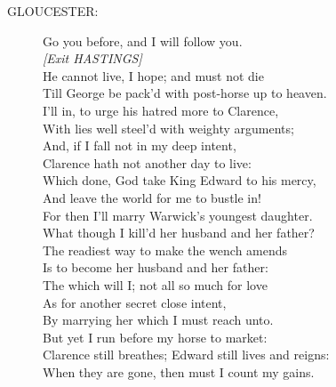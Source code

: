 \documentclass{article}
\begin{document}
\begin{description}
\item[GLOUCESTER:] 
\hspace{1pt}Go you before, and I will follow you.\\
{\it [Exit HASTINGS]}\\
\hspace{1pt}He cannot live, I hope; and must not die\\
\hspace{1pt}Till George be pack'd with post-horse up to heaven.\\
\hspace{1pt}I'll in, to urge his hatred more to Clarence,\\
\hspace{1pt}With lies well steel'd with weighty arguments;\\
\hspace{1pt}And, if I fall not in my deep intent,\\
\hspace{1pt}Clarence hath not another day to live:\\
\hspace{1pt}Which done, God take King Edward to his mercy,\\
\hspace{1pt}And leave the world for me to bustle in!\\
\hspace{1pt}For then I'll marry Warwick's youngest daughter.\\
\hspace{1pt}What though I kill'd her husband and her father?\\
\hspace{1pt}The readiest way to make the wench amends\\
\hspace{1pt}Is to become her husband and her father:\\
\hspace{1pt}The which will I; not all so much for love\\
\hspace{1pt}As for another secret close intent,\\
\hspace{1pt}By marrying her which I must reach unto.\\
\hspace{1pt}But yet I run before my horse to market:\\
\hspace{1pt}Clarence still breathes; Edward still lives and reigns:\\
\hspace{1pt}When they are gone, then must I count my gains.\\
\end{description}
\centering{\it [Exit]}\\
\end{document}

